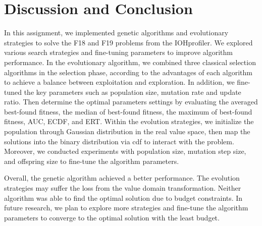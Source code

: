 \documentclass{article}
\begin{document}
\section{Discussion and Conclusion}
\label{sec:dis&res}
In this assignment, we implemented genetic algorithms and evolutionary strategies to solve the F18 and F19 problems from the IOHprofiler. We explored various search strategies and fine-tuning parameters to improve algorithm performance. In the evolutionary algorithm, we combined three classical selection algorithms in the selection phase, according to the advantages of each algorithm to achieve a balance between exploitation and exploration. In addition, we fine-tuned the key parameters such as population size, mutation rate and update ratio. Then determine the optimal parameters settings by evaluating the averaged best-found fitness, the median of best-found fitness, the
maximum of best-found fitness, AUC, ECDF, and ERT. Within the evolution strategies, we initialize the population through Gaussian distribution in the real value space, then map the solutions into the binary distribution via cdf to interact with the problem. Moreover, we conducted experiments with population size, mutation step size, and offspring size to fine-tune the algorithm parameters.
 
Overall, the genetic algorithm achieved a better performance. The evolution strategies may suffer the loss from the value domain transformation. Neither algorithm was able to find the optimal solution due to budget constraints. In future research, we plan to explore more strategies and fine-tune the algorithm parameters to converge to the optimal solution with the least budget.


  
  
\end{document}
